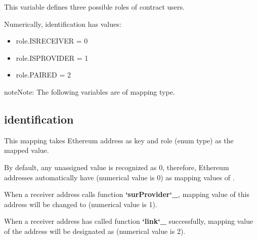 \documentclass[letterpaper,10pt,english]{sphinxmanual}
\begin{document}
This variable defines three possible roles of contract users.

Numerically, identification has values:
\begin{itemize}
\item {} 
role.ISRECEIVER = 0

\item {} 
role.ISPROVIDER = 1

\item {} 
role.PAIRED = 2

\end{itemize}

\begin{sphinxadmonition}{note}{Note:}
The following variables are of mapping type.

\end{sphinxadmonition}


\subsection{identification}
\label{\detokenize{ContractVariables:identification}}
%
\begin{sphinxVerbatim}[commandchars=\\\{\}]
     
\end{sphinxVerbatim}

This mapping takes Ethereum address as key and role (enum type) as the mapped value.

By default, any unassigned value is recognized as 0, therefore,
Ethereum addresses automatically have  (numerical value is 0) as mapping values of {\hyperref[\detokenize{ContractVariables:identification}]{}}.

When a receiver address calls function {\color{red}\bfseries{}{}`surProvider{}`\_},
 mapping value of this address will be changed to  (numerical value is 1).

When a receiver address has called function {\color{red}\bfseries{}{}`link{}`\_} successfully,
mapping value of the address will be designated as  (numerical value is 2).
\end{document}
